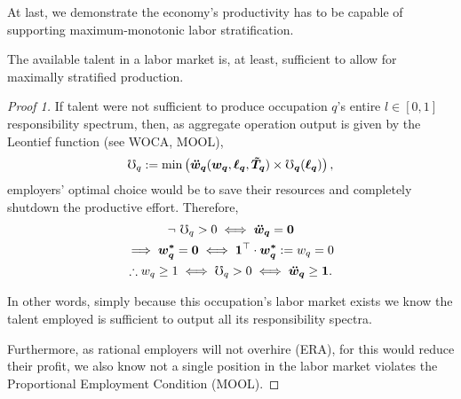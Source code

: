\documentclass[hidelinks, nonatbib]{elsarticle}
\begin{document}
At last, we demonstrate the economy's productivity has to be capable of supporting maximum-monotonic labor stratification.
\begin{lemma}
    The available talent in a labor market is, at least, sufficient to allow for maximally stratified production.
    
    \begin{proof}[Proof 1]
        If talent were not sufficient to produce occupation $q$'s entire $l \in [0,1]$ responsibility spectrum, then, as aggregate operation output is given by the Leontief function (see WOCA, MOOL),
        \begin{gather}
            \mho_q
            :=
            \min\left(
                \boldsymbol{\ddot{w}_{q}}(
                    \boldsymbol{w_{q}},
                    \boldsymbol{\ell_{q}},
                    \boldsymbol{\tilde{T}_{q}}
                )
                \times
                \boldsymbol{\mho_{q}}(
                    \boldsymbol{\ell_{q}}
                )
            \right)
        ,
        \end{gather}
        employers' optimal choice would be to save their resources and completely shutdown the productive effort. Therefore,
        \begin{gather}
            \lnot \
            \mho_q > 0
            \iff
            \boldsymbol{\ddot{w}_{q}}
            =
            \boldsymbol{0}
            \\
            \implies
            \boldsymbol{w_{q}^{*}}
            =
            \boldsymbol{0}
            \iff
            \boldsymbol{1} ^ {\top}
            \cdot
            \boldsymbol{w_{q}^{*}}
            :=
            w_q
            =
            0
            \\
            \label{mpc}
            \therefore
            w_q \geq 1
            \iff 
            \mho_q > 0
            \iff
            \boldsymbol{\ddot{w}_{q}}
            \geq
            \boldsymbol{1}
            .
        \end{gather}

        In other words, simply because this occupation's labor market exists we know the talent employed is sufficient to output all its responsibility spectra.
        
        Furthermore, as rational employers will not overhire (ERA), for this would reduce their profit, we also know not a single position in the labor market violates the Proportional Employment Condition (MOOL).
        

\end{proof}
\end{lemma}
\end{document}
